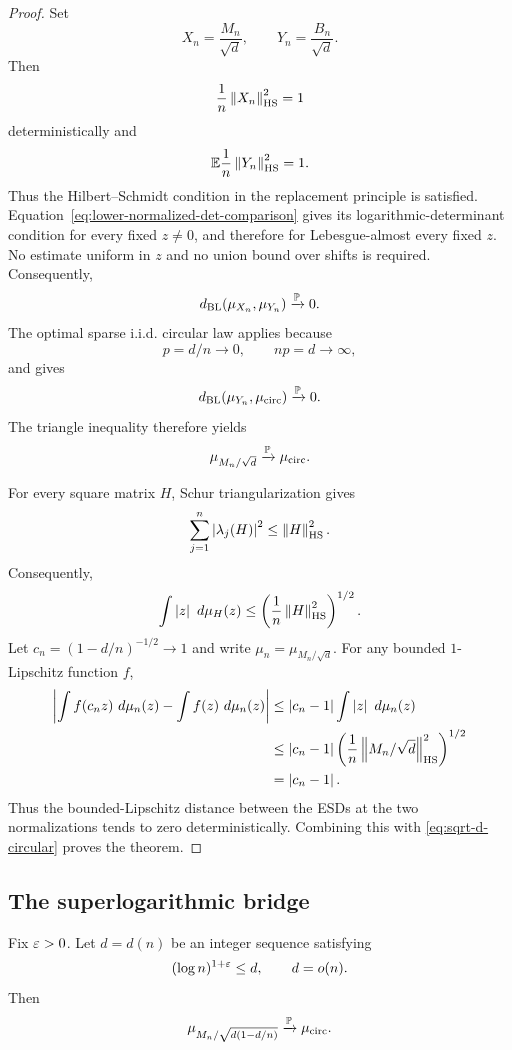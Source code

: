 \begin{proof}
Set
\[
  X_n=\frac{M_n}{\sqrt d},
  \qquad
  Y_n=\frac{B_n}{\sqrt d}.
\]
Then
\[
  \frac1n\left\|X_n\right\|_{\mathrm{HS}}^2=1
\]
deterministically and
\[
  \mathbb E\frac1n\left\|Y_n\right\|_{\mathrm{HS}}^2=1.
\]
Thus the Hilbert--Schmidt condition in the replacement principle
\cite[Theorem~2.1]{TV10} is satisfied. Equation~\eqref{eq:lower-normalized-det-comparison} gives its logarithmic-determinant condition for every fixed $z\ne0$, and therefore for Lebesgue-almost every fixed $z$. No estimate uniform in $z$ and no union bound over shifts is required. Consequently,
\begin{equation}\label{eq:BL-row-Bernoulli}
  d_{\mathrm{BL}}(\mu_{X_n},\mu_{Y_n})\xrightarrow{\mathbb P}0.
\end{equation}
The optimal sparse i.i.d. circular law \cite{RT19,SSS25} applies because
\[
  p=d/n\to0,
  \qquad
  np=d\to\infty,
\]
and gives
\[
  d_{\mathrm{BL}}(\mu_{Y_n},\mu_{\mathrm{circ}})\xrightarrow{\mathbb P}0.
\]
The triangle inequality therefore yields
\begin{equation}\label{eq:sqrt-d-circular}
  \mu_{M_n/\sqrt d}\xrightarrow{\mathbb P}\mu_{\mathrm{circ}}.
\end{equation}

For every square matrix $H$, Schur triangularization gives
\[
  \sum_{j=1}^n\left|\lambda_j(H)\right|^2\le\left\|H\right\|_{\mathrm{HS}}^2.
\]
Consequently,
\[
  \int\left|z\right|\,\,d\mu_H(z)
  \le\left(\frac1n\left\|H\right\|_{\mathrm{HS}}^2\right)^{1/2}.
\]
Let $c_n=(1-d/n)^{-1/2}\to1$ and write $\mu_n=\mu_{M_n/\sqrt d}$. For any bounded $1$-Lipschitz function $f$,
\begin{align*}
  \left|\int f(c_nz)\,\,d\mu_n(z)-\int f(z)\,\,d\mu_n(z)\right|
  &\le\left|c_n-1\right|\int\left|z\right|\,\,d\mu_n(z)\\
  &\le\left|c_n-1\right|
  \left(\frac1n\left\|M_n/\sqrt d\right\|_{\mathrm{HS}}^2\right)^{1/2}\\
  &=\left|c_n-1\right|.
\end{align*}
Thus the bounded-Lipschitz distance between the ESDs at the two normalizations tends to zero deterministically. Combining this with \eqref{eq:sqrt-d-circular} proves the theorem.
\end{proof}

\subsection{The superlogarithmic bridge}\label{subsec:superlog-bridge}

\begin{proposition}\label{prop:superlog-bridge}
Fix $\varepsilon>0$. Let $d=d(n)$ be an integer sequence satisfying
\[
  (\log n)^{1+\varepsilon}\le d,
  \qquad
  d=o(n).
\]
Then
\[
  \mu_{M_n/\sqrt{d(1-d/n)}}\xrightarrow{\mathbb P}\mu_{\mathrm{circ}}.
\]
\end{proposition}

